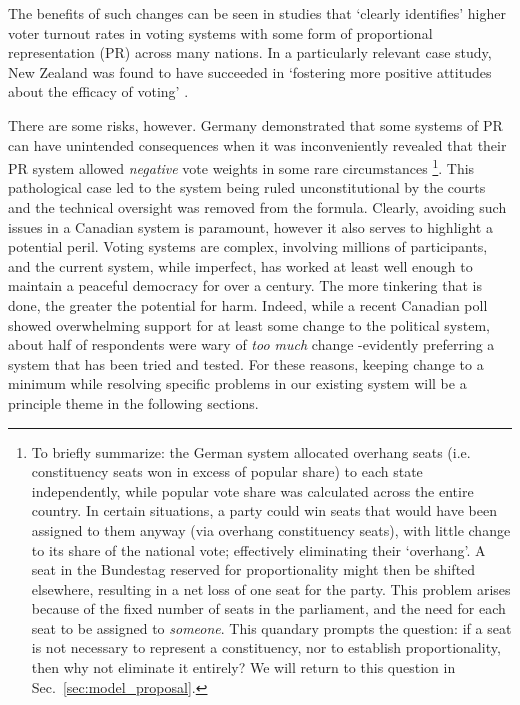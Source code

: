 \documentclass[DIV=calc, paper=a4, fontsize=11pt, twocolumn]{scrartcl}	 %
\begin{document}
The benefits of such changes can be seen in studies that `clearly identifies' higher voter turnout rates in voting systems with some form of proportional representation (PR) \cite{Blais}
 across many nations. In a particularly relevant case study, New Zealand was found to have succeeded in `fostering more positive attitudes about the efficacy of voting' \cite{NZ_PR_results}.

There are some risks, however. Germany demonstrated that some systems of PR can have unintended consequences when it was inconveniently revealed that their PR system allowed \emph{negative} vote weights in some rare circumstances\cite{Die_Zeit_negative_vote} 
\footnote
{
To briefly summarize: the German system allocated overhang seats (i.e. constituency seats won in excess of popular share) to each state independently, while popular vote share was calculated across the entire country.
In certain situations, a party could win seats that would have been assigned to them anyway (via overhang constituency seats), with little change to its share of the national vote; effectively eliminating their `overhang'. A seat in the Bundestag reserved for proportionality might then be shifted elsewhere, resulting in a net loss of one seat for the party.
This problem arises because of the fixed number of seats in the parliament, and the need for each seat to be assigned to \emph{someone}. This quandary prompts the question: if a seat is not necessary to represent a constituency, nor to establish proportionality, then why not eliminate it entirely? We will return to this question in Sec.~\ref{sec:model_proposal}.
}.
This pathological case led to the system being ruled unconstitutional by the courts and the technical oversight was removed from the formula. 
Clearly, avoiding such issues in a Canadian system is paramount, however it also serves to highlight a potential peril.
Voting systems are complex, involving millions of participants, and the current system, while imperfect, has worked at least well enough to maintain a peaceful democracy for over a century. 
The more tinkering that is done, the greater the potential for harm. 
Indeed, while a recent Canadian poll\cite{Broadbent_poll} showed overwhelming support for at least some change to the political system, about half of respondents were wary of \emph{too much} change \--evidently preferring a system that has been tried and tested. 
For these reasons, keeping change to a minimum while resolving specific problems in our existing system will be a principle theme in the following sections.
\end{document}
